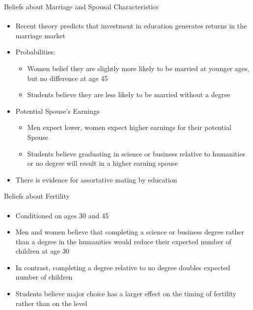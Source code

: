 \documentclass[12pt]{beamer}
\begin{document}
\begin{frame}{Beliefs about Marriage and Spousal Characteristics}
    \framesubtitle{} 
    \begin{itemize}
        \item Recent theory predicts that investment in education generates returns in the marriage market
        \item Probabilities: 
        \begin{itemize}
            \item Women belief they are slightly more likely to be married at younger ages, but no difference at age 45
            \item Students believe they are less likely to be married without a degree
        \end{itemize}
        \item Potential Spouse's Earnings
        \begin{itemize}
            \item Men expect lower, women expect higher earnings for their potential Spouse
            \item Students believe graduating in science or business relative to humanities or no degree will result in a higher earning spouse
        \end{itemize}
        \item There is evidence for assortative mating by education
    \end{itemize}
\end{frame}

\begin{frame}{Beliefs about Fertility}
    \framesubtitle{} 
    \begin{itemize}
        \item Conditioned on ages 30 and 45
        \item Men and women believe that completing a science or business degree rather than a degree in the humanities would reduce their expected number of children at age 30
        \item In contrast, completing a degree relative to no degree doubles expected number of children
        \item Students believe major choice has a larger effect on the timing of fertility rather than on the level
    \end{itemize}
\end{frame}
\end{document}
